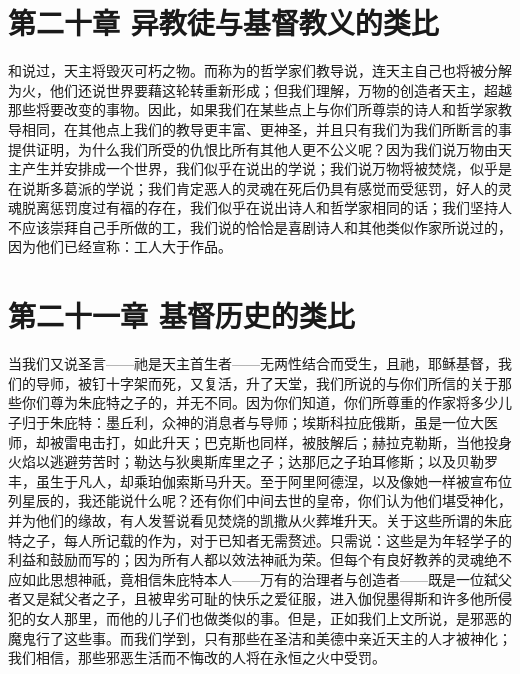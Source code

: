 
\section{第二十章 异教徒与基督教义的类比}

和说过，天主将毁灭可朽之物。而称为的哲学家们教导说，连天主自己也将被分解为火，他们还说世界要藉这轮转重新形成；但我们理解，万物的创造者天主，超越那些将要改变的事物。因此，如果我们在某些点上与你们所尊崇的诗人和哲学家教导相同，在其他点上我们的教导更丰富、更神圣，并且只有我们为我们所断言的事提供证明，为什么我们所受的仇恨比所有其他人更不公义呢？因为我们说万物由天主产生并安排成一个世界，我们似乎在说出的学说；我们说万物将被焚烧，似乎是在说斯多葛派的学说；我们肯定恶人的灵魂在死后仍具有感觉而受惩罚，好人的灵魂脱离惩罚度过有福的存在，我们似乎在说出诗人和哲学家相同的话；我们坚持人不应该崇拜自己手所做的工，我们说的恰恰是喜剧诗人和其他类似作家所说过的，因为他们已经宣称：工人大于作品。\par


\section{第二十一章 基督历史的类比}

当我们又说圣言——祂是天主首生者——无两性结合而受生，且祂，耶稣基督，我们的导师，被钉十字架而死，又复活，升了天堂，我们所说的与你们所信的关于那些你们尊为朱庇特之子的，并无不同。因为你们知道，你们所尊重的作家将多少儿子归于朱庇特：墨丘利，众神的消息者与导师；埃斯科拉庇俄斯，虽是一位大医师，却被雷电击打，如此升天；巴克斯也同样，被肢解后；赫拉克勒斯，当他投身火焰以逃避劳苦时；勒达与狄奥斯库里之子；达那厄之子珀耳修斯；以及贝勒罗丰，虽生于凡人，却乘珀伽索斯马升天。至于阿里阿德涅，以及像她一样被宣布位列星辰的，我还能说什么呢？还有你们中间去世的皇帝，你们认为他们堪受神化，并为他们的缘故，有人发誓说看见焚烧的凯撒从火葬堆升天。关于这些所谓的朱庇特之子，每人所记载的作为，对于已知者无需赘述。只需说：这些是为年轻学子的利益和鼓励而写的；因为所有人都以效法神祇为荣。但每个有良好教养的灵魂绝不应如此思想神祇，竟相信朱庇特本人——万有的治理者与创造者——既是一位弑父者又是弑父者之子，且被卑劣可耻的快乐之爱征服，进入伽倪墨得斯和许多他所侵犯的女人那里，而他的儿子们也做类似的事。但是，正如我们上文所说，是邪恶的魔鬼行了这些事。而我们学到，只有那些在圣洁和美德中亲近天主的人才被神化；我们相信，那些邪恶生活而不悔改的人将在永恒之火中受罚。\par

